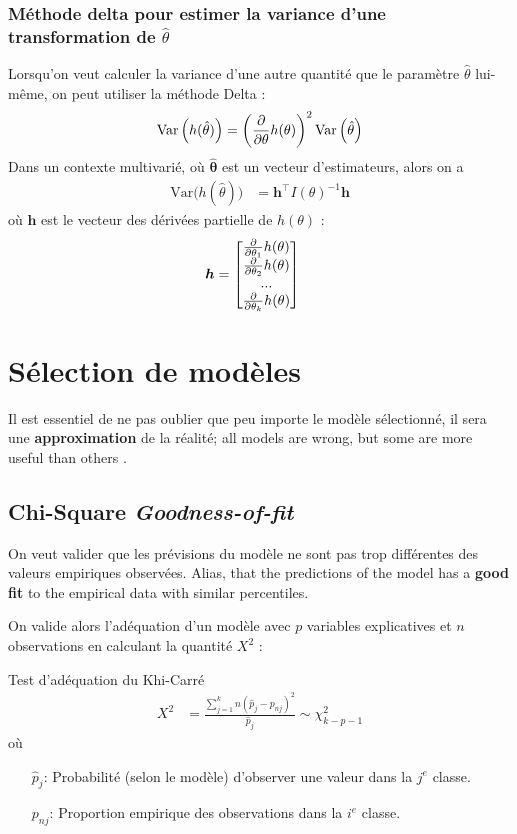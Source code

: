 \documentclass[10pt, french]{article}
\begin{document}
\begin{multicols*}{3}
\subsubsection*{Méthode delta pour estimer la variance d'une transformation de $\hat{\theta}$}
Lorsqu'on veut calculer la variance d'une autre quantité que le paramètre $\hat{\theta}$ lui-même, on peut utiliser la méthode Delta : 
\[
	\mathrm{Var} \left( h(\hat{\theta}) \right)
	= 	\left( \frac{\partial}{\partial \theta} h(\theta) \right)^2 \mathrm{Var} \left( \hat{\theta} \right)
\]
Dans un contexte multivarié, où $\bm{\hat{\theta}}$ est un vecteur d'estimateurs, alors on a
\begin{align*}
	\text{Var}\big(h(\hat{\theta})\big)	
	&= 	\bm{h}^{\top} I(\theta)^{-1} \bm{h}
\end{align*}
où $\bm{h}$ est le vecteur des dérivées partielle de $h(\theta)$ : 
\begin{align*}
	\bm{h}	
	&=	\begin{bmatrix}
			\frac{\partial}{\partial \theta_1} h(\theta) \\
			\frac{\partial}{\partial \theta_2} h(\theta) \\
			... \\
			\frac{\partial}{\partial \theta_k} h(\theta) \\
		\end{bmatrix}
\end{align*}


\setcounter{section}{14}
\section{Sélection de modèles}

Il est essentiel de ne pas oublier que peu importe le modèle sélectionné, il sera une \textbf{approximation} de la réalité; \guillemotleft all models are wrong, but some are more useful than others \guillemotright.

\subsection*{Chi-Square \emph{Goodness-of-fit}}

On veut valider que les prévisions du modèle ne sont pas trop différentes des valeurs empiriques observées. 
Alias, that the predictions of the model has a \textbf{good fit} to the empirical data with similar percentiles.

On valide alors l'adéquation d'un modèle avec $p$ variables explicatives et $n$ observations en calculant la quantité $X^2$ : 
\begin{algo}{Test d'adéquation du Khi-Carré}
\begin{align*}
	X^2 
	&= 	\frac{\sum_{j = 1}^{k} n(\hat{p}_j - p_{nj})^2 }{\hat{p}_j} 
	\sim	\chi^{2}_{k - p - 1}
\end{align*}
où 
\begin{enumerate}
	\item[$\hat{p}_j$:]	Probabilité (selon le modèle) d'observer une valeur dans la $j^{e}$ classe.
	\item[$p_{nj}$:]	Proportion empirique des observations dans la $i^{e}$ classe.
\end{enumerate}
\end{algo}



\end{multicols*}
\end{document}
